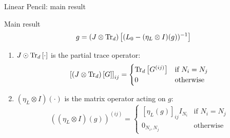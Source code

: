 \documentclass[10pt]{beamer}
\begin{document}
\begin{frame}{Linear Pencil: main result}
  \begin{block}{Main result \cite{spectra,mingo2017free}}
    \begin{equation}\label{eq:main-result-linear-pencil}
        g = \traceLimOp[d]{
            (L_0 - (\eta_L \otimes I)(g))^{-1}
        }
    \end{equation}
  \end{block}
\begin{enumerate}
  \item   $J \odot \traceLim[d]{\cdot}$ is the partial trace operator:
  \begin{equation*}
    \left[\traceLimOp[d]{G}\right]_{ij} = 
    \begin{cases}
      \traceLim[d]{G^{(ij)}} & \text{if } N_i=N_j\\
      0 & \text{otherwise}
    \end{cases}
  \end{equation*}

  \item $(\eta_L \otimes I)(\cdot)$ is the matrix operator acting on $g$:
  \begin{equation*}
    ((\eta_L \otimes I)(g))^{(ij)} = 
    \begin{cases}
      [\eta_L(g)]_{ij} I_{N_i} & \text{if } N_i=N_j\\
      0_{N_i,N_j} & \text{otherwise}
    \end{cases}
  \end{equation*}
  \end{enumerate}
    
\end{frame}
\end{document}
